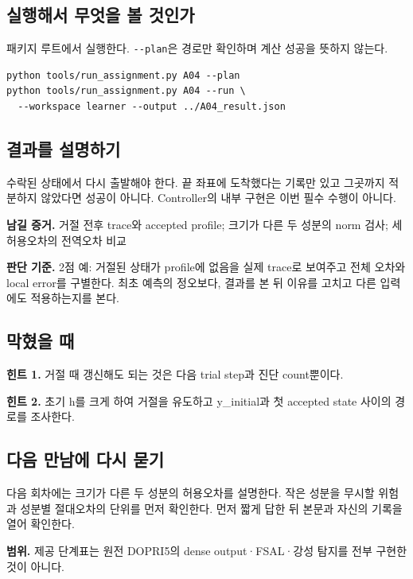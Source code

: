 \documentclass[
  10pt,
  a4paper,
]{article}
\begin{document}
\newpage

\subsection{실행해서 무엇을 볼
것인가}\label{uxc2e4uxd589uxd574uxc11c-uxbb34uxc5c7uxc744-uxbcfc-uxac83uxc778uxac00}

패키지 루트에서 실행한다. \texttt{-\/-plan}은 경로만 확인하며 계산
성공을 뜻하지 않는다.

\begin{verbatim}
python tools/run_assignment.py A04 --plan
python tools/run_assignment.py A04 --run \
  --workspace learner --output ../A04_result.json
\end{verbatim}

\subsection{결과를
설명하기}\label{uxacb0uxacfcuxb97c-uxc124uxba85uxd558uxae30}

수락된 상태에서 다시 출발해야 한다. 끝 좌표에 도착했다는 기록만 있고
그곳까지 적분하지 않았다면 성공이 아니다. Controller의 내부 구현은 이번
필수 수행이 아니다.

\textbf{남길 증거.} 거절 전후 trace와 accepted profile; 크기가 다른 두
성분의 norm 검사; 세 허용오차의 전역오차 비교

\textbf{판단 기준.} 2점 예: 거절된 상태가 profile에 없음을 실제 trace로
보여주고 전체 오차와 local error를 구별한다. 최초 예측의 정오보다,
결과를 본 뒤 이유를 고치고 다른 입력에도 적용하는지를 본다.

\subsection{막혔을 때}\label{uxb9c9uxd614uxc744-uxb54c}

\textbf{힌트 1.} 거절 때 갱신해도 되는 것은 다음 trial step과 진단
count뿐이다.

\textbf{힌트 2.} 초기 h를 크게 하여 거절을 유도하고 y\_initial과 첫
accepted state 사이의 경로를 조사한다.

\subsection{다음 만남에 다시
묻기}\label{uxb2e4uxc74c-uxb9ccuxb0a8uxc5d0-uxb2e4uxc2dc-uxbb3buxae30}

다음 회차에는 크기가 다른 두 성분의 허용오차를 설명한다. 작은 성분을
무시할 위험과 성분별 절대오차의 단위를 먼저 확인한다. 먼저 짧게 답한 뒤
본문과 자신의 기록을 열어 확인한다.

\textbf{범위.} 제공 단계표는 원전 DOPRI5의 dense output·FSAL·강성 탐지를
전부 구현한 것이 아니다.
\end{document}
